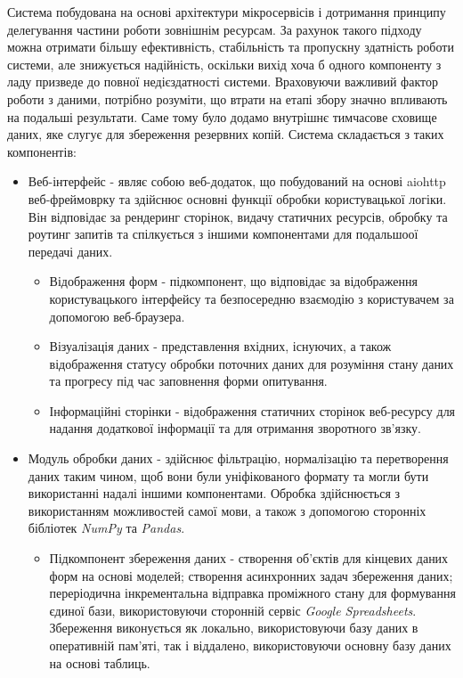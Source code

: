 Система побудована на основі архітектури мікросервісів і дотримання принципу делегування частини роботи зовнішнім ресурсам. За рахунок такого підходу можна отримати більшу ефективність, стабільність та пропускну здатність роботи системи, але знижується надійність, оскільки вихід хоча б одного компоненту з ладу призведе до повної недієздатності системи. Враховуючи важливий фактор роботи з даними, потрібно розуміти, що втрати на етапі збору значно впливають на подальші результати. Саме тому було додамо внутрішнє тимчасове сховище даних, яке слугує для збереження резервних копій. Система складається з таких компонентів:
\begin{itemize}
	\item Веб-інтерфейс - являє собою веб-додаток, що побудований на основі aiohttp веб-фреймоврку та здійснює основні функції обробки користувацької логіки. Він відповідає за рендеринг сторінок, видачу статичних ресурсів, обробку та роутинг запитів та спілкується з іншими компонентами для подальшоої передачі даних. 
	\begin{itemize}
		\item Відображення форм - підкомпонент, що відповідає за відображення користувацького інтерфейсу та безпосередню взаємодію з користувачем за допомогою веб-браузера.
		\item Візуалізація даних - представлення вхідних, існуючих, а також відображення статусу обробки поточних даних для розуміння стану даних та прогресу під час заповнення форми опитування.
		\item Інформаційні сторінки - відображення статичних сторінок веб-ресурсу для надання додаткової інформації та для отримання зворотного зв'язку.
	\end{itemize}
	\item Модуль обробки даних - здійснює фільтрацію, нормалізацію та перетворення даних таким чином, щоб вони були уніфікованого формату та могли бути використанні надалі іншими компонентами. Обробка здійснюється з використанням можливостей самої мови, а також з допомогою сторонніх бібліотек \textit{NumPy} та \textit{Pandas}.
	\begin{itemize}
		\item Підкомпонент збереження даних - створення об'єктів для кінцевих даних форм на основі моделей; створення асинхронних задач збереження даних; переріодична інкрементальна відправка проміжного стану для формування єдиної бази, використовуючи сторонній сервіс \textit{Google Spreadsheets}. Збереження виконується як локально, використовуючи базу даних в оперативній пам'яті, так і віддалено, використовуючи основну базу даних на основі таблиць.

\end{itemize}
\end{itemize}
